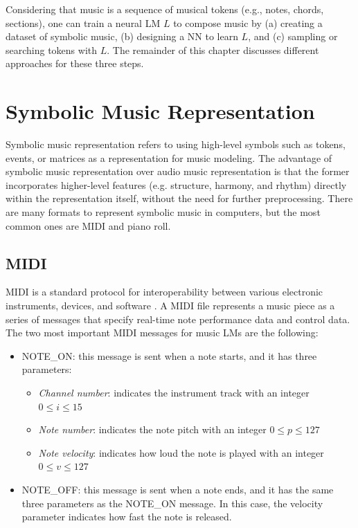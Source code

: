 Considering that music is a sequence of musical tokens (e.g., notes, chords, sections), one can train a neural LM $L$ to compose music by (a) creating a dataset of symbolic music, (b) designing a NN to learn $L$, and (c) sampling or searching tokens with $L$. The remainder of this chapter discusses different approaches for these three steps.

\section{Symbolic Music Representation}

Symbolic music representation refers to using high-level symbols such as tokens, events, or matrices as a representation for music modeling. The advantage of symbolic music representation over audio music representation is that the former incorporates higher-level features (e.g. structure, harmony, and rhythm) directly within the representation itself, without the need for further preprocessing. There are many formats to represent symbolic music in computers, but the most common ones are MIDI and piano roll.

\subsection{MIDI}
MIDI is a standard protocol for interoperability between various electronic instruments, devices, and software \cite{briot2017deep}. A MIDI file represents a music piece as a series of messages that specify real-time note performance data and control data. The two most important MIDI messages for music LMs are the following:

\begin{itemize}
  \item NOTE\_ON: this message is sent when a note starts, and it has three parameters:
  \begin{itemize}
      \item \textit{Channel number}: indicates the instrument track with an integer $0 \leq i \leq 15$
      \item \textit{Note number}: indicates the note pitch with an integer $0 \leq p \leq 127$
      \item \textit{Note velocity}: indicates how loud the note is played with an integer
      $0 \leq v \leq 127$
  \end{itemize}

  \item NOTE\_OFF: this message is sent when a note ends, and it has the same three parameters as the
  NOTE\_ON message. In this case, the velocity parameter indicates how fast the note is released.
\end{itemize}

